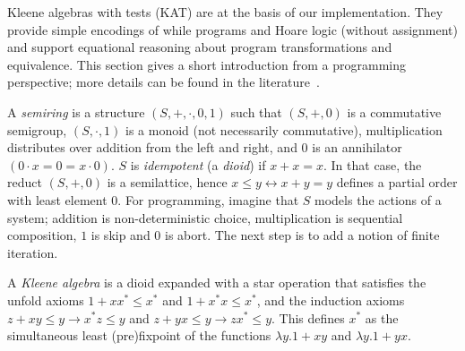\documentclass{llncs}
\begin{document}
Kleene algebras with tests (KAT) are at the basis of our
implementation. They provide simple encodings of while programs and
Hoare logic (without assignment) and support equational reasoning
about program transformations and equivalence.  This section gives a
short introduction from a programming perspective; more details can be
found in the literature~\cite{Kozen97}.

A \emph{semiring} is a structure $(S,+,\cdot,0,1)$ such that $(S,+,0)$
is a commutative semigroup, $(S,\cdot,1)$ is a monoid (not necessarily
commutative), multiplication distributes over addition from the left
and right, and $0$ is an annihilator $(0\cdot x = 0 = x\cdot 0)$. $S$
is \emph{idempotent} (a \emph{dioid}) if $x+x=x$. In that case, the
reduct $(S,+,0)$ is a semilattice, hence $x \le y \longleftrightarrow
x+y=y$ defines a partial order with least element $0$.  For
programming, imagine that $S$ models the actions of a system; addition
is non-deterministic choice, multiplication is sequential composition,
$1$ is skip and $0$ is abort. The next step is to add a notion of
finite iteration.

A \emph{Kleene algebra} is a dioid expanded with a star operation that
satisfies the unfold axioms $1 + xx^\ast \le x^\ast$ and $1 + x^\ast x
\le x^\ast$, and the induction axioms $z + xy \le y \longrightarrow
x^\ast z \le y$ and $z + yx \le y \longrightarrow zx^\ast \le y$. This
defines $x^\ast$ as the simultaneous least (pre)fixpoint of the
functions $\lambda y. 1+xy$ and $\lambda y.1+yx$.
\end{document}
